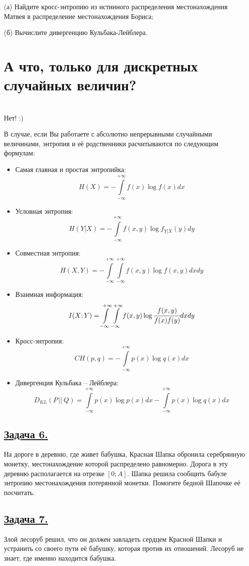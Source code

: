 (а) Найдите кросс-энтропию из истинного распределения местонахождения Матвея в распределение местонахождения Бориса;

(б) Вычислите дивергенцию Кульбака-Лейблера.

\section*{А что, только для дискретных случайных величин?}~\
\\

Нет! :)

В случае, если Вы работаете с абсолютно непрерывными случайными величинами, энтропия и её родственники расчитываются по следующим формулам:
\begin{itemize}
    \item Самая главная и простая энтропийка:
    \[H(X)=-\int\limits_{-\infty}^{+\infty} f(x)\log f(x)dx \]
    \item Условная энтропия:
    \[H(Y|X)=-\int\limits_{-\infty}^{+\infty} f(x, y)\log f_{Y|X}(y)dy \]
    \item Совместная энтропия:
    \[H(X, Y)=-\int\limits_{-\infty}^{+\infty} \int\limits_{-\infty}^{+\infty} f(x, y)\log f(x, y)dxdy \]
    \item Взаимная информация:
    \[I(X; Y)=\int\limits_{-\infty}^{+\infty} \int\limits_{-\infty}^{+\infty} f(x, y) \log \cfrac{f(x, y)}{f(x)f(y)}dxdy \]
    \item Кросс-энтропия:
    \[CH(p, q)=-\int\limits_{-\infty}^{+\infty}p(x)\log q(x) dx \]
    \item Дивергенция Кульбака -- Лейблера:
    \[D_{KL}(P\, ||\, Q)=\int\limits_{-\infty}^{+\infty} p(x)\log p(x)dx -\int\limits_{-\infty}^{+\infty} p(x)\log q(x)dx  \]
\end{itemize}

\subsection*{\hyperref[sec:sol_problem6]{Задача 6.}}\label{sec:problem6} На дороге в деревню, где живет бабушка, Красная Шапка обронила серебрянную монетку, местонахождение которой распределено равномерно. Дорога в эту деревню располагается на отрезке $[0; A]$. Шапка решила сообщить бабуле энтропию местонахождения потерянной монетки. Помогите бедной Шапочке её посчитать.

\subsection*{\hyperref[sec:sol_problem7]{Задача 7.}}\label{sec:problem7} Злой лесоруб решил, что он должен завладеть сердцем Красной Шапки и устранить со своего пути её бабушку, которая против их отношений. Лесоруб не знает, где именно находится бабушка.

